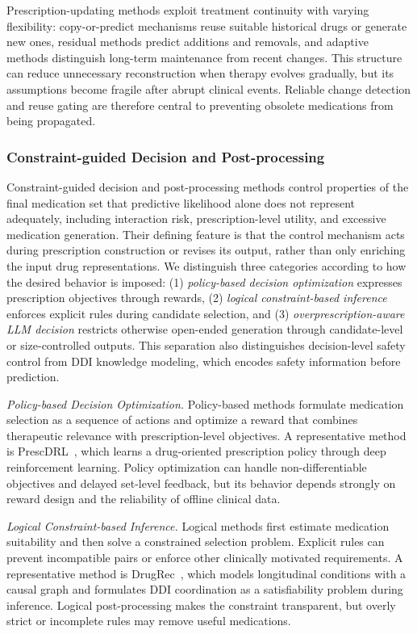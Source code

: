 \documentclass[manuscript,review]{acmart}
\begin{document}
Prescription-updating methods exploit treatment continuity with varying flexibility: copy-or-predict mechanisms reuse suitable historical drugs or generate new ones, residual methods predict additions and removals, and adaptive methods distinguish long-term maintenance from recent changes. This structure can reduce unnecessary reconstruction when therapy evolves gradually, but its assumptions become fragile after abrupt clinical events. Reliable change detection and reuse gating are therefore central to preventing obsolete medications from being propagated.

\subsubsection{Constraint-guided Decision and Post-processing}

Constraint-guided decision and post-processing methods control properties of the final medication set that predictive likelihood alone does not represent adequately, including interaction risk, prescription-level utility, and excessive medication generation. Their defining feature is that the control mechanism acts during prescription construction or revises its output, rather than only enriching the input drug representations. We distinguish three categories according to how the desired behavior is imposed: (1) \textit{policy-based decision optimization} expresses prescription objectives through rewards, (2) \textit{logical constraint-based inference} enforces explicit rules during candidate selection, and (3) \textit{overprescription-aware LLM decision} restricts otherwise open-ended generation through candidate-level or size-controlled outputs. This separation also distinguishes decision-level safety control from DDI knowledge modeling, which encodes safety information before prediction.

\textit{Policy-based Decision Optimization.} Policy-based methods formulate medication selection as a sequence of actions and optimize a reward that combines therapeutic relevance with prescription-level objectives. A representative method is PrescDRL~\cite{yang2024prescdrl}, which learns a drug-oriented prescription policy through deep reinforcement learning. Policy optimization can handle non-differentiable objectives and delayed set-level feedback, but its behavior depends strongly on reward design and the reliability of offline clinical data.

\textit{Logical Constraint-based Inference.} Logical methods first estimate medication suitability and then solve a constrained selection problem. Explicit rules can prevent incompatible pairs or enforce other clinically motivated requirements. A representative method is DrugRec~\cite{sun2022debiased}, which models longitudinal conditions with a causal graph and formulates DDI coordination as a satisfiability problem during inference. Logical post-processing makes the constraint transparent, but overly strict or incomplete rules may remove useful medications.
\end{document}
